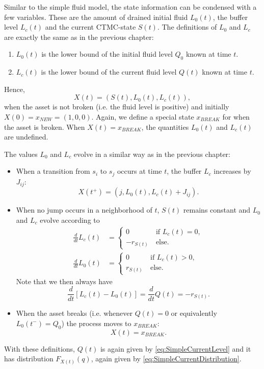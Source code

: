 Similar to the simple fluid model, the state information can be condensed with a few variables.
These are the amount of drained initial fluid $L_0(t)$, the buffer level $L_c(t)$ and the current CTMC-state $S(t)$.
The definitions of $L_0$ and $L_c$ are exactly the same as in the previous chapter:
\begin{enumerate}
	\item $L_0(t)$ is the lower bound of the initial fluid level $Q_0$ known at time $t$.
	\item $L_c(t)$ is the lower bound of the current fluid level $Q(t)$ known at time $t$.
\end{enumerate}
Hence,
\[
X(t)=(S(t),L_0(t),L_c(t)),
\]
when the asset is not broken (i.e. the fluid level is positive) and initially $X(0)=x_{NEW}=(1,0,0)$.
Again, we define a special state $x_{BREAK}$ for when the asset is broken.
When $X(t)=x_{BREAK}$, the quantities $L_0(t)$ and $L_c(t)$ are undefined.

The values $L_0$ and $L_c$ evolve in a similar way as in the previous chapter:
\begin{itemize}
	\item When a transition from $s_i$ to $s_j$ occurs at time $t$, the buffer $L_c$ increases by $J_{ij}$:
	\begin{equation}\label{eq:MmfmJumpEvolution}
	X(t^+)=(j,L_0(t),L_c(t)+J_{ij}).
	\end{equation}
	\item When no jump occurs in a neighborhood of $t$, $S(t)$ remains constant and $L_0$ and $L_c$ evolve according to
	\begin{equation}\label{eq:MmfmAgeEvolution}
	\begin{split}
	\frac{d}{dt}L_c(t)&=\begin{cases}
	0&\ \text{if }L_c(t)=0,\\
	-r_{S(t)}&\ \text{else.}
	\end{cases}\\
	\frac{d}{dt}L_0(t)&=\begin{cases}
	0&\ \text{if }L_c(t)>0,\\
	r_{S(t)}&\ \text{else.}
	\end{cases}
	\end{split}
	\end{equation}
	Note that we then always have
	\[
	\frac{d}{dt}\left[L_c(t)-L_0(t)\right]=\frac{d}{dt}Q(t)=-r_{S(t)}.
	\]
	\item When the asset breaks (i.e. whenever $Q(t)=0$ or equivalently $L_0(t^-)=Q_0$) the process moves to $x_{BREAK}$:
	\[
	X(t)=x_{BREAK}.
	\]
\end{itemize}
With these definitions, $Q(t)$ is again given by \eqref{eq:SimpleCurrentLevel} and it has distribution $F_{X(t)}(q)$,  again given by \eqref{eq:SimpleCurrentDistribution}.

